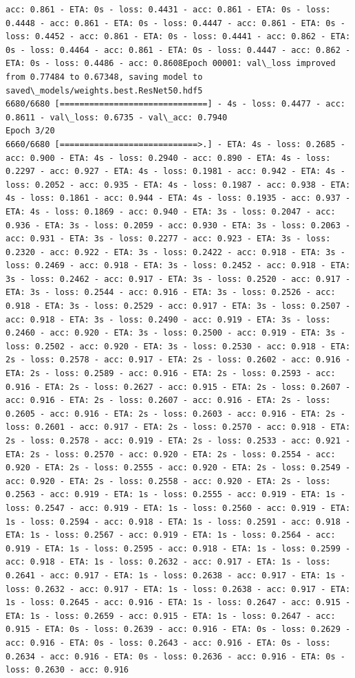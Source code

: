 \documentclass[11pt]{article}
\begin{document}
\begin{Verbatim}[commandchars=\\\{\}]
acc: 0.861 - ETA: 0s - loss: 0.4431 - acc: 0.861 - ETA: 0s - loss: 0.4448 - acc: 0.861 - ETA: 0s - loss: 0.4447 - acc: 0.861 - ETA: 0s - loss: 0.4452 - acc: 0.861 - ETA: 0s - loss: 0.4441 - acc: 0.862 - ETA: 0s - loss: 0.4464 - acc: 0.861 - ETA: 0s - loss: 0.4447 - acc: 0.862 - ETA: 0s - loss: 0.4486 - acc: 0.8608Epoch 00001: val\_loss improved from 0.77484 to 0.67348, saving model to saved\_models/weights.best.ResNet50.hdf5
6680/6680 [==============================] - 4s - loss: 0.4477 - acc: 0.8611 - val\_loss: 0.6735 - val\_acc: 0.7940
Epoch 3/20
6660/6680 [============================>.] - ETA: 4s - loss: 0.2685 - acc: 0.900 - ETA: 4s - loss: 0.2940 - acc: 0.890 - ETA: 4s - loss: 0.2297 - acc: 0.927 - ETA: 4s - loss: 0.1981 - acc: 0.942 - ETA: 4s - loss: 0.2052 - acc: 0.935 - ETA: 4s - loss: 0.1987 - acc: 0.938 - ETA: 4s - loss: 0.1861 - acc: 0.944 - ETA: 4s - loss: 0.1935 - acc: 0.937 - ETA: 4s - loss: 0.1869 - acc: 0.940 - ETA: 3s - loss: 0.2047 - acc: 0.936 - ETA: 3s - loss: 0.2059 - acc: 0.930 - ETA: 3s - loss: 0.2063 - acc: 0.931 - ETA: 3s - loss: 0.2277 - acc: 0.923 - ETA: 3s - loss: 0.2320 - acc: 0.922 - ETA: 3s - loss: 0.2422 - acc: 0.918 - ETA: 3s - loss: 0.2469 - acc: 0.918 - ETA: 3s - loss: 0.2452 - acc: 0.918 - ETA: 3s - loss: 0.2462 - acc: 0.917 - ETA: 3s - loss: 0.2520 - acc: 0.917 - ETA: 3s - loss: 0.2544 - acc: 0.916 - ETA: 3s - loss: 0.2526 - acc: 0.918 - ETA: 3s - loss: 0.2529 - acc: 0.917 - ETA: 3s - loss: 0.2507 - acc: 0.918 - ETA: 3s - loss: 0.2490 - acc: 0.919 - ETA: 3s - loss: 0.2460 - acc: 0.920 - ETA: 3s - loss: 0.2500 - acc: 0.919 - ETA: 3s - loss: 0.2502 - acc: 0.920 - ETA: 3s - loss: 0.2530 - acc: 0.918 - ETA: 2s - loss: 0.2578 - acc: 0.917 - ETA: 2s - loss: 0.2602 - acc: 0.916 - ETA: 2s - loss: 0.2589 - acc: 0.916 - ETA: 2s - loss: 0.2593 - acc: 0.916 - ETA: 2s - loss: 0.2627 - acc: 0.915 - ETA: 2s - loss: 0.2607 - acc: 0.916 - ETA: 2s - loss: 0.2607 - acc: 0.916 - ETA: 2s - loss: 0.2605 - acc: 0.916 - ETA: 2s - loss: 0.2603 - acc: 0.916 - ETA: 2s - loss: 0.2601 - acc: 0.917 - ETA: 2s - loss: 0.2570 - acc: 0.918 - ETA: 2s - loss: 0.2578 - acc: 0.919 - ETA: 2s - loss: 0.2533 - acc: 0.921 - ETA: 2s - loss: 0.2570 - acc: 0.920 - ETA: 2s - loss: 0.2554 - acc: 0.920 - ETA: 2s - loss: 0.2555 - acc: 0.920 - ETA: 2s - loss: 0.2549 - acc: 0.920 - ETA: 2s - loss: 0.2558 - acc: 0.920 - ETA: 2s - loss: 0.2563 - acc: 0.919 - ETA: 1s - loss: 0.2555 - acc: 0.919 - ETA: 1s - loss: 0.2547 - acc: 0.919 - ETA: 1s - loss: 0.2560 - acc: 0.919 - ETA: 1s - loss: 0.2594 - acc: 0.918 - ETA: 1s - loss: 0.2591 - acc: 0.918 - ETA: 1s - loss: 0.2567 - acc: 0.919 - ETA: 1s - loss: 0.2564 - acc: 0.919 - ETA: 1s - loss: 0.2595 - acc: 0.918 - ETA: 1s - loss: 0.2599 - acc: 0.918 - ETA: 1s - loss: 0.2632 - acc: 0.917 - ETA: 1s - loss: 0.2641 - acc: 0.917 - ETA: 1s - loss: 0.2638 - acc: 0.917 - ETA: 1s - loss: 0.2632 - acc: 0.917 - ETA: 1s - loss: 0.2638 - acc: 0.917 - ETA: 1s - loss: 0.2645 - acc: 0.916 - ETA: 1s - loss: 0.2647 - acc: 0.915 - ETA: 1s - loss: 0.2659 - acc: 0.915 - ETA: 1s - loss: 0.2647 - acc: 0.915 - ETA: 0s - loss: 0.2639 - acc: 0.916 - ETA: 0s - loss: 0.2629 - acc: 0.916 - ETA: 0s - loss: 0.2643 - acc: 0.916 - ETA: 0s - loss: 0.2634 - acc: 0.916 - ETA: 0s - loss: 0.2636 - acc: 0.916 - ETA: 0s - loss: 0.2630 - acc: 0.916 
\end{Verbatim}
\end{document}
